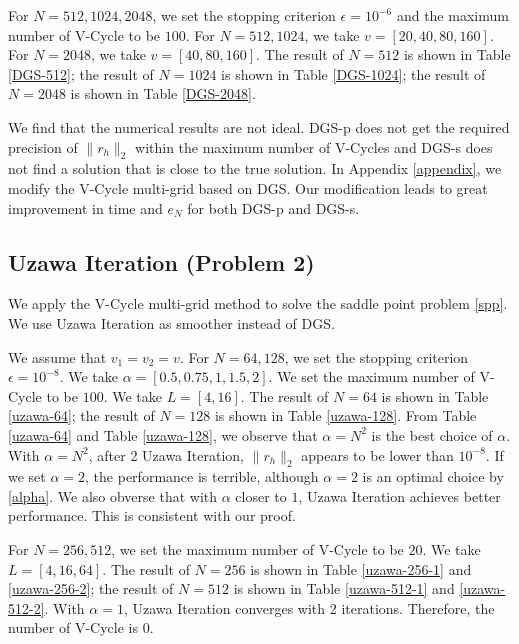 \documentclass[english]{pkupaper}
\begin{document}
For $N = 512, 1024, 2048$, we set the stopping criterion $\epsilon =10^{-6}$ and the maximum number of V-Cycle to be $100$. For $N = 512, 1024$, we take $v = [20, 40, 80, 160]$.  For $N=2048$, we take $v = [40, 80, 160]$. The result of $N=512$ is shown in Table \ref{DGS-512}; the result of $N=1024$ is shown in Table \ref{DGS-1024}; the result of $N=2048$ is shown in Table \ref{DGS-2048}.





We find that the numerical results are not ideal. DGS-p does not get the required precision of $\|r_h\|_2$ within the maximum number of V-Cycles and DGS-s does not find a solution that is close to the true solution. In Appendix \ref{appendix}, we modify the V-Cycle multi-grid based on DGS. Our modification leads to great improvement in time and $e_N$ for both DGS-p and DGS-s.

\subsection{Uzawa Iteration (Problem 2)}
We apply the V-Cycle multi-grid method to solve the saddle point problem \ref{spp}. We use Uzawa Iteration as smoother instead of DGS. 

We assume that $v_1=v_2=v$. For $N=64, 128$, we set the stopping criterion $\epsilon = 10^{-8}$. We take $\alpha = [0.5, 0.75, 1, 1.5, 2]$. We set the maximum number of V-Cycle to be $100$. We take $L=[4, 16]$. 
The result of $N=64$ is shown in Table \ref{uzawa-64}; the result of $N=128$ is shown in Table \ref{uzawa-128}.  From Table \ref{uzawa-64} and Table \ref{uzawa-128}, we observe that $\alpha = N^2$ is the best choice of $\alpha$. With $\alpha = N^2$, after 2 Uzawa Iteration, $\|r_h\|_2$ appears to be lower than $10^{-8}$. If we set $\alpha=2$, the performance is terrible, although $\alpha=2$ is an optimal choice by \ref{alpha}. We also obverse that with $\alpha$ closer to $1$, Uzawa Iteration achieves better performance. This is consistent with our proof.




For $N=256, 512$, we set the maximum number of V-Cycle to be $20$. We take $L=[4, 16, 64]$. The result of $N=256$ is shown in Table \ref{uzawa-256-1} and \ref{uzawa-256-2}; the result of $N=512$ is shown in Table \ref{uzawa-512-1} and \ref{uzawa-512-2}. With $\alpha=1$, Uzawa Iteration converges with 2 iterations. Therefore, the number of V-Cycle is $0$. 




\end{document}
